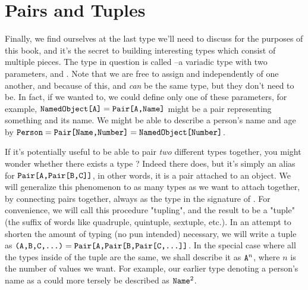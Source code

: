 

\section{Pairs and Tuples}
Finally, we find ourselves at the last type we'll need to discuss for the purposes of this book, and it's the secret to
building interesting types which consist of multiple pieces. The type in question is called --a variadic
type with two parameters,  and . Note that we are free to assign  and  independently of
one another, and because of this,  and  \textit{can} be the same type, but they don't need to be. In
fact, if we wanted to, we could define only one of these parameters, for example, $\text{\texttt{NamedObject[A]}} =
\text{\texttt{Pair[A,Name]}}$ might be a pair representing something and its name. We might be able to describe a person's name and age by $\text{\texttt{Person}} = \text{\texttt{Pair[Name,Number]}} =
\text{\texttt{NamedObject[Number]}}$.

If it's potentially useful to be able to pair \textit{two} different types together, you might wonder whether there
exists a type ? Indeed there does, but it's simply an alias for $\text{\texttt{Pair[A,Pair[B,C]]}}$, in
other words, it is a pair attached to an object. We will generalize this phenomenon to as many types as we want to
attach together, by connecting pairs together, always as the  type in the signature of . For
convenience, we will call this procedure "tupling", and the result to be a "tuple" (the suffix of words like quadruple,
quintuple, sextuple, etc.). In an attempt to shorten the amount of typing (no pun intended) necessary, we will write a tuple as $\text{\texttt{(A,B,C,\dots)}} = \text{\texttt{Pair[A,Pair[B,Pair[C,\dots]]}}$. In the
special case where all the types inside of the tuple are the same, we shall describe it as $\text{\texttt{A}}^n$, where $n$ is
the number of values we want. For example, our earlier type denoting a
person's name as a  could more tersely be described as $\text{\texttt{Name}}^2$.

